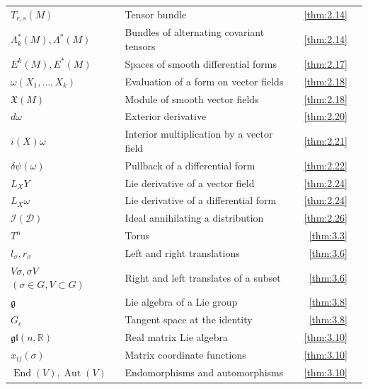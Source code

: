 {\begin{longtable}{@{}>{\raggedright\arraybackslash}p{.39\linewidth}>{\raggedright\arraybackslash}p{.39\linewidth}r r@{}}
$T_{r,\allowbreak s}(M)$ & Tensor bundle & \ref{thm:2.14} & \pageref{thm:2.14} \\
$\Lambda_{k}^{*}(M),\allowbreak  \Lambda^{*}(M)$ & Bundles of alternating covariant tensors & \ref{thm:2.14} & \pageref{thm:2.14} \\
$E^k(M),\allowbreak E^*(M)$ & Spaces of smooth differential forms & \ref{thm:2.17} & \pageref{thm:2.17} \\
$\omega(X_{1},\allowbreak \ldots,\allowbreak X_{k})$ & Evaluation of a form on vector fields & \ref{thm:2.18} & \pageref{thm:2.18} \\
$\mathfrak{X}(M)$ & Module of smooth vector fields & \ref{thm:2.18} & \pageref{thm:2.18} \\
$d\omega$ & Exterior derivative & \ref{thm:2.20} & \pageref{thm:2.20} \\
$i(X)\omega$ & Interior multiplication by a vector field & \ref{thm:2.21} & \pageref{thm:2.21} \\
$\delta\psi(\omega)$ & Pullback of a differential form & \ref{thm:2.22} & \pageref{thm:2.22} \\
$L_{X}Y$ & Lie derivative of a vector field & \ref{thm:2.24} & \pageref{thm:2.24} \\
$L_{X}\omega$ & Lie derivative of a differential form & \ref{thm:2.24} & \pageref{thm:2.24} \\
$\mathcal I(\mathcal D)$ & Ideal annihilating a distribution & \ref{thm:2.26} & \pageref{thm:2.26} \\
$T^{n}$ & Torus & \ref{thm:3.3} & \pageref{thm:3.3} \\
$l_\sigma,\allowbreak r_\sigma$ & Left and right translations & \ref{thm:3.6} & \pageref{thm:3.6} \\
$V\sigma,\allowbreak \sigma V$ $(\sigma\in G,\allowbreak V\subset G)$ & Right and left translates of a subset & \ref{thm:3.6} & \pageref{thm:3.6} \\
$\mathfrak g$ & Lie algebra of a Lie group & \ref{thm:3.8} & \pageref{thm:3.8} \\
$G_{e}$ & Tangent space at the identity & \ref{thm:3.8} & \pageref{thm:3.8} \\
$\mathfrak{gl}(n,\allowbreak \mathbb R)$ & Real matrix Lie algebra & \ref{thm:3.10} & \pageref{thm:3.10} \\
$x_{ij}(\sigma)$ & Matrix coordinate functions & \ref{thm:3.10} & \pageref{thm:3.10} \\
$\operatorname{End}(V),\allowbreak \operatorname{Aut}(V)$ & Endomorphisms and automorphisms & \ref{thm:3.10} & \pageref{thm:3.10} \\

\end{longtable}}
